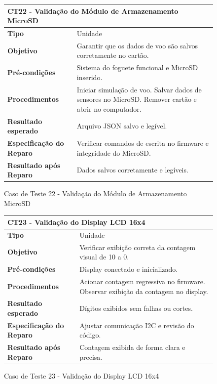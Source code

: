 \begin{figure}[H]
    \centering
\begin{longtable}{|p{}|p{}|}
\hline
\multicolumn{2}{|l|}{\textbf{CT22 - Validação do Módulo de Armazenamento MicroSD}} \\
\hline
\textbf{Tipo} & Unidade \\
\hline
\textbf{Objetivo} & Garantir que os dados de voo são salvos corretamente no cartão. \\
\hline
\textbf{Pré-condições} & Sistema do foguete funcional e MicroSD inserido. \\
\hline
\textbf{Procedimentos} &  Iniciar simulação de voo.  Salvar dados de sensores no MicroSD.  Remover cartão e abrir no computador.  \\
\hline
\textbf{Resultado esperado} & Arquivo JSON salvo e legível. \\
\hline
\textbf{Especificação do Reparo} & Verificar comandos de escrita no firmware e integridade do MicroSD. \\
\hline
\textbf{Resultado após Reparo} & Dados salvos corretamente e legíveis. \\
\hline
\end{longtable}
\caption{Caso de Teste 22 - Validação do Módulo de Armazenamento MicroSD}
\label{fig_ct22_validacao_modulo_armazenamento_microsd}
\end{figure}

\begin{figure}[H]
    \centering
\begin{longtable}{|p{}|p{}|}
\hline
\multicolumn{2}{|l|}{\textbf{CT23 - Validação do Display LCD 16x4}} \\
\hline
\textbf{Tipo} & Unidade \\
\hline
\textbf{Objetivo} & Verificar exibição correta da contagem visual de 10 a 0. \\
\hline
\textbf{Pré-condições} & Display conectado e inicializado. \\
\hline
\textbf{Procedimentos} & Acionar contagem regressiva no firmware.  Observar exibição da contagem no display.  \\
\hline
\textbf{Resultado esperado} & Dígitos exibidos sem falhas ou cortes. \\
\hline
\textbf{Especificação do Reparo} & Ajustar comunicação I2C e revisão do código. \\
\hline
\textbf{Resultado após Reparo} & Contagem exibida de forma clara e precisa. \\
\hline
\end{longtable}
\caption{Caso de Teste 23 - Validação do Display LCD 16x4}
\label{fig_ct23_validacao_display_lcd}
\end{figure}


